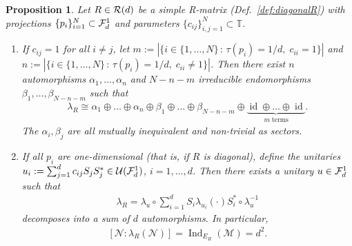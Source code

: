 \documentclass[12pt,a4paper]{amsart}
\numberwithin{equation}{section}
\newtheorem{proposition}[theorem]{Proposition}
\theoremstyle{remark}
\def\id{\operatorname{id}}
\def\Ind{\operatorname{Ind}}
\def\id{\operatorname{id}}
\def\T{\mathbb{T}}
\newcommand{\la}{\lambda}
\newcommand{\CM}[0]{\mathcal{M}} \newcommand{\CN}[0]{\mathcal{N}}
\newcommand{\CU}[0]{\mathcal{U}} \newcommand{\CV}[0]{\mathcal{V}}
\begin{document}
\begin{proposition}\label{corollary:relativecommutant}
Let $R\in\mathcal{R}(d)$ be a simple R-matrix (Def.~\ref{def:diagonalR}) with projections $\{p_i\}_{i=1}^N\subset\mathcal{F}_d^1$ and parameters $\{c_{ij}\}_{i,j=1}^N\subset\T$.
\begin{enumerate}
    \item\label{item:decomposelambdaR-fornormalforms} If $c_{ij}=1$ for all $i\neq j$, let $m:=|\{i\in\{1,\ldots,N\}\,:\,\tau(p_i)=1/d,\;c_{ii}=1\}|$ and $n:=|\{i\in\{1,\ldots,N\}\,:\,\tau(p_i)=1/d,\;c_{ii}\neq1\}|$. Then there exist $n$ automorphisms $\alpha_1,\ldots,\alpha_n$ and $N-n-m$ irreducible endomorphisms $\beta_1,\ldots,\beta_{N-n-m}$ such that
    \begin{align}
        \la_R\cong \alpha_1\oplus\ldots\oplus\alpha_n\oplus\beta_1\oplus\ldots\oplus\beta_{N-n-m}\oplus\underbrace{\id\oplus\ldots\oplus\id}_{m \;\text{terms}}
        .
    \end{align}
    The $\alpha_i,\beta_j$ are all mutually inequivalent and non-trivial as sectors.
    \item\label{item:decomposelambdaR-fordiagonalR} If all $p_i$ are one-dimensional (that is, if $R$ is diagonal), define the unitaries  $u_i:=\sum_{j=1}^d c_{ij}S_jS_j^*\in\CU(\CF_d^1)$, $i=1,\ldots,d$. Then there exists a unitary $u\in\mathcal{F}_d^1$ such that
    \begin{align}\label{eq:diagonal-decomposition}
        \lambda_R=\la_u\circ\sum_{i=1}^dS_i\lambda_{u_i}(\cdot)S_i^*\circ\la_u^{-1}
    \end{align}
    decomposes into a sum of $d$ automorphisms. In particular, 
    \begin{align}\label{eq:indexofdiagonalR}
        [\CN:\la_R(\CN)] 
        = 
        \Ind_{E_R}(\CM) 
        =
        d^2
        .
    \end{align}
\end{enumerate}
\end{proposition}
\end{document}
